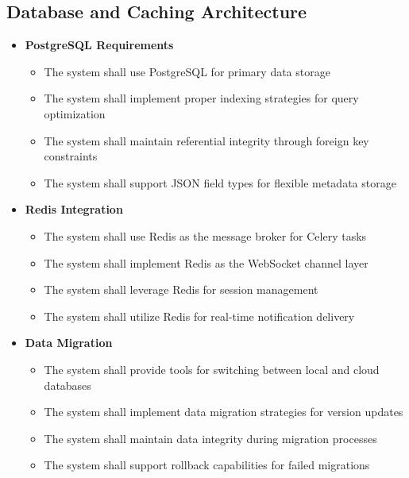 \subsection{Database and Caching Architecture}
\begin{itemize}
    \item \textbf{PostgreSQL Requirements}
    \begin{itemize}
        \item The system shall use PostgreSQL for primary data storage
        \item The system shall implement proper indexing strategies for query optimization
        \item The system shall maintain referential integrity through foreign key constraints
        \item The system shall support JSON field types for flexible metadata storage
    \end{itemize}
    
    \item \textbf{Redis Integration}
    \begin{itemize}
        \item The system shall use Redis as the message broker for Celery tasks
        \item The system shall implement Redis as the WebSocket channel layer
        \item The system shall leverage Redis for session management
        \item The system shall utilize Redis for real-time notification delivery
    \end{itemize}
    
    \item \textbf{Data Migration}
    \begin{itemize}
        \item The system shall provide tools for switching between local and cloud databases
        \item The system shall implement data migration strategies for version updates
        \item The system shall maintain data integrity during migration processes
        \item The system shall support rollback capabilities for failed migrations
    \end{itemize}
\end{itemize}

